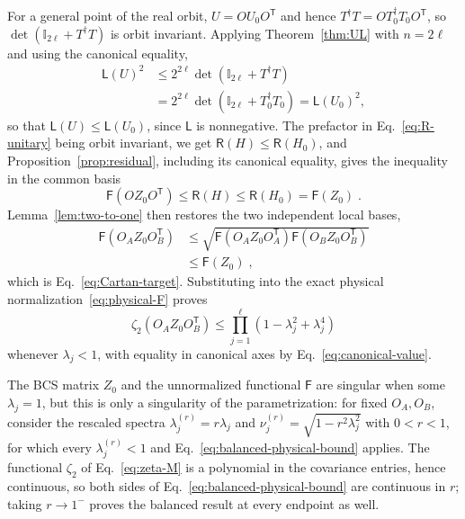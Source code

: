 \documentclass[aps,prl,twocolumn,superscriptaddress,reprint,longbibliography,nofootinbib]{revtex4-2}
\newcommand{\trans}{\mathsf{T}}
\begin{document}
For a general point of the real orbit, $U=OU_0O^{\trans}$ and hence $T^\dagger T=OT_0^\dagger T_0O^{\trans}$, so $\det(\mathbb{I}_{2\ell}+T^\dagger T)$ is orbit invariant. Applying Theorem~\ref{thm:UL} with $n=2\ell$ and using the canonical equality,
\begin{equation}
\begin{split}
    \mathsf{L}(U)^2&\le 2^{2\ell}\det(\mathbb{I}_{2\ell}+T^\dagger T)\\&=2^{2\ell}\det(\mathbb{I}_{2\ell}+T_0^\dagger T_0)=\mathsf{L}(U_0)^2 ,
\end{split}
\end{equation}
so that $\mathsf{L}(U)\le \mathsf{L}(U_0)$, since $\mathsf{L}$ is nonnegative. The prefactor in Eq.~\eqref{eq:R-unitary} being orbit invariant, we get $\mathsf{R}(H)\le \mathsf{R}(H_0)$, and Proposition~\ref{prop:residual}, including its canonical equality, gives the inequality in the common basis
\begin{equation}
    \mathsf{F}(OZ_0O^{\trans})\le \mathsf{R}(H)\le \mathsf{R}(H_0)=\mathsf{F}(Z_0)\;.
\end{equation}
Lemma~\ref{lem:two-to-one} then restores the two independent local bases,
\begin{equation}
\begin{split}
    \mathsf{F}(O_AZ_0O_B^{\trans})&\le\sqrt{\mathsf{F}(O_AZ_0O_A^{\trans})\mathsf{F}(O_BZ_0O_B^{\trans})}\\&\le \mathsf{F}(Z_0)\;,
\end{split}
\end{equation}
which is Eq.~\eqref{eq:Cartan-target}. Substituting into the exact physical normalization~\eqref{eq:physical-F} proves
\begin{equation}
    \zeta_2\!\left(O_AZ_0O_B^{\trans}\right)\le\prod_{j=1}^{\ell}\left(1-\lambda_j^2+\lambda_j^4\right)
    \label{eq:balanced-physical-bound}
\end{equation}
whenever $\lambda_j<1$, with equality in canonical axes by Eq.~\eqref{eq:canonical-value}.

The BCS matrix $Z_0$ and the unnormalized functional $\mathsf{F}$ are singular when some $\lambda_j=1$, but this is only a singularity of the parametrization: for fixed $O_A,O_B$, consider the rescaled spectra $\lambda_j^{(r)}=r\lambda_j$ and $\nu_j^{(r)}=\sqrt{1-r^2\lambda_j^2}$ with $0<r<1$, for which every $\lambda_j^{(r)}<1$ and Eq.~\eqref{eq:balanced-physical-bound} applies. The functional $\zeta_2$ of Eq.~\eqref{eq:zeta-M} is a polynomial in the covariance entries, hence continuous, so both sides of Eq.~\eqref{eq:balanced-physical-bound} are continuous in $r$; taking $r\to1^-$ proves the balanced result at every endpoint as well.
\end{document}
